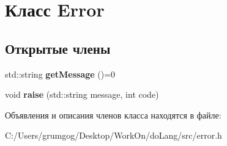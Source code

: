 \hypertarget{class_error}{}\section{Класс Error}
\label{class_error}
\subsection*{Открытые члены}
\begin{DoxyCompactItemize}
\item 
\mbox{\label{class_error_a07cef63e2e6bcddefed6ddc32bdbea1c}} 
std\+::string {\bfseries get\+Message} ()=0
\item 
\mbox{\label{class_error_a914935dbc2dde0dc49c47a4d2210efca}} 
void {\bfseries raise} (std\+::string message, int code)
\end{DoxyCompactItemize}


Объявления и описания членов класса находятся в файле\+:\begin{DoxyCompactItemize}
\item 
C\+:/\+Users/grumgog/\+Desktop/\+Work\+On/do\+Lang/src/error.\+h\end{DoxyCompactItemize}
